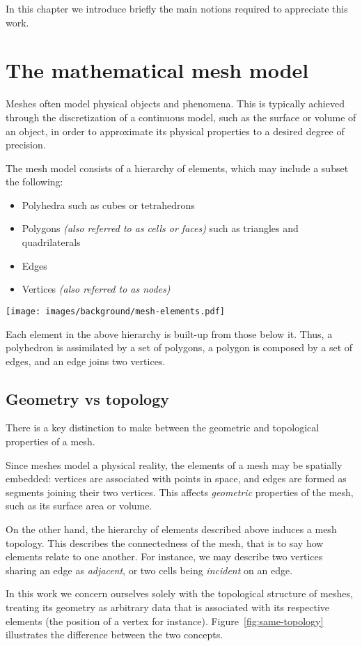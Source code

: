 In this chapter we introduce briefly the main notions required to appreciate this work.

\section{The mathematical mesh model}

Meshes often model physical objects and phenomena. This is typically achieved through the discretization of a continuous model, such as the surface or volume of an object, in order to approximate its physical properties to a desired degree of precision.
\par

The mesh model consists of a hierarchy of elements, which may include a subset the following:
\begin{itemize}
\item Polyhedra such as cubes or tetrahedrons
\item Polygons \emph{(also referred to as cells or faces)} such as triangles and quadrilaterals
\item Edges
\item Vertices \emph{(also referred to as nodes)}
\end{itemize}

\texttt{[image: images/background/mesh-elements.pdf]}

Each element in the above hierarchy is built-up from those below it. Thus, a polyhedron is assimilated by a set of polygons, a polygon is composed by a set of edges, and an edge joins two vertices.


\subsection{Geometry vs topology}
There is a key distinction to make between the geometric and topological properties of a mesh.

Since meshes model a physical reality, the elements of a mesh may be spatially embedded: vertices are associated with points in space, and edges are formed as segments joining their two vertices. This affects \emph{geometric} properties of the mesh, such as its surface area or volume.

On the other hand, the hierarchy of elements described above induces a mesh topology. This describes the connectedness of the mesh, that is to say how elements relate to one another. For instance, we may describe two vertices sharing an edge as \emph{adjacent}, or two cells being \emph{incident} on an edge.
\par
In this work we concern ourselves solely with the topological structure of meshes, treating its geometry as arbitrary data that is associated with its respective elements (the position of a vertex for instance). Figure~\ref{fig:same-topology} illustrates the difference between the two concepts.

